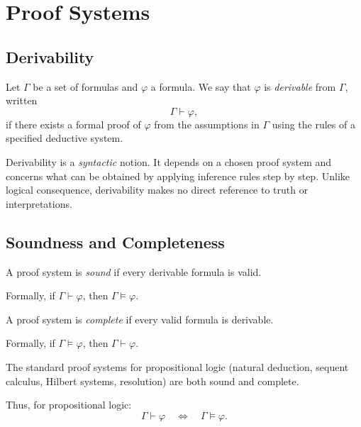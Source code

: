 
\section{Proof Systems}

\subsection{Derivability}

\begin{definition}[Derivability]
Let $\Gamma$ be a set of formulas and $\varphi$ a formula.
We say that $\varphi$ is \emph{derivable} from $\Gamma$, written
\[
\Gamma \vdash \varphi,
\]
if there exists a formal proof of $\varphi$ from the assumptions in $\Gamma$
using the rules of a specified deductive system.
\end{definition}

\begin{remark}
Derivability is a \emph{syntactic} notion. It depends on a chosen proof system
and concerns what can be obtained by applying inference rules step by step.
Unlike logical consequence, derivability makes no direct reference to truth or
interpretations.
\end{remark}

\subsection{Soundness and Completeness}

\begin{definition}[Soundness]
A proof system is \emph{sound} if every derivable formula is valid.

Formally, if $\Gamma \vdash \varphi$, then $\Gamma \models \varphi$.
\end{definition}

\begin{definition}[Completeness]
A proof system is \emph{complete} if every valid formula is derivable.

Formally, if $\Gamma \models \varphi$, then $\Gamma \vdash \varphi$.
\end{definition}

\begin{theorem}
The standard proof systems for propositional logic (natural deduction, sequent
calculus, Hilbert systems, resolution) are both sound and complete.

Thus, for propositional logic:
\[
\Gamma \vdash \varphi \quad\Longleftrightarrow\quad \Gamma \models \varphi.
\]
\end{theorem}

